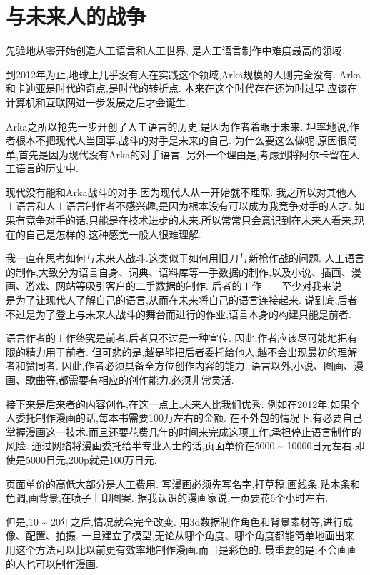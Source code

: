 \chapter{与未来人的战争}
先验地从零开始创造人工语言和人工世界,
是人工语言制作中难度最高的领域.

到2012年为止,地球上几乎没有人在实践这个领域,Arka规模的人则完全没有.
Arka和卡迪亚是时代的奇点,是时代的转折点.
本来在这个时代存在还为时过早.应该在计算机和互联网进一步发展之后才会诞生.

Arka之所以抢先一步开创了人工语言的历史,是因为作者着眼于未来.
坦率地说,作者根本不把现代人当回事.战斗的对手是未来的自己.
为什么要这么做呢,原因很简单,首先是因为现代没有Arka的对手语言.
另外一个理由是,考虑到将阿尔卡留在人工语言的历史中.

现代没有能和Arka战斗的对手.因为现代人从一开始就不理睬.
我之所以对其他人工语言和人工语言制作者不感兴趣,是因为根本没有可以成为我竞争对手的人才.
如果有竞争对手的话,只能是在技术进步的未来.所以常常只会意识到在未来人看来,现在的自己是怎样的.这种感觉一般人很难理解.

我一直在思考如何与未来人战斗.这类似于如何用旧刀与新枪作战的问题.
人工语言的制作,大致分为语言自身、词典、语料库等一手数据的制作,以及小说、插画、漫画、游戏、网站等吸引客户的二手数据的制作.
后者的工作——至少对我来说——是为了让现代人了解自己的语言,从而在未来将自己的语言连接起来.
说到底,后者不过是为了登上与未来人战斗的舞台而进行的作业,语言本身的构建只能是前者.

语言作者的工作终究是前者.后者只不过是一种宣传.
因此,作者应该尽可能地把有限的精力用于前者.
但可悲的是,越是能把后者委托给他人,越不会出现最初的理解者和赞同者.
因此,作者必须具备全方位创作内容的能力.
语言以外,小说、图画、漫画、歌曲等,都需要有相应的创作能力.必须非常灵活.

接下来是后来者的内容创作,在这一点上,未来人比我们优秀.
例如在2012年,如果个人委托制作漫画的话,每本书需要100万左右的金额.
在不外包的情况下,有必要自己掌握漫画这一技术.而且还要花费几年的时间来完成这项工作,承担停止语言制作的风险.
通过网络将漫画委托给半专业人士的话,页面单价在5000 \~{} 10000日元左右.即使是5000日元,200p就是100万日元.

页面单价的高低大部分是人工费用.
写漫画必须先写名字,打草稿,画线条,贴木条和色调,画背景,在喷子上印图案.
据我认识的漫画家说,一页要花6个小时左右.

但是,10 \~{} 20年之后,情况就会完全改变.
用3d数据制作角色和背景素材等,进行成像、配置、拍摄.
一旦建立了模型,无论从哪个角度、哪个角度都能简单地画出来.
用这个方法可以比以前更有效率地制作漫画.而且是彩色的.
最重要的是,不会画画的人也可以制作漫画.

